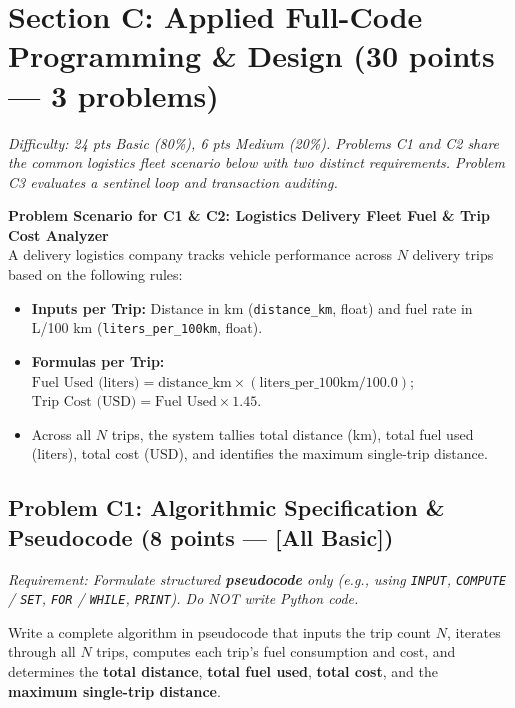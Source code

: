 \documentclass[11pt,a4paper]{article}
\begin{document}
\section*{Section C: Applied Full-Code Programming \& Design \hfill \normalsize\normalfont(30 points --- 3 problems)}
\textit{Difficulty: 24 pts Basic (80\%), 6 pts Medium (20\%). Problems C1 and C2 share the common logistics fleet scenario below with two distinct requirements. Problem C3 evaluates a sentinel loop and transaction auditing.}

\begin{tcolorbox}[colback=boxbg, colframe=secondaryteal, arc=1.2mm, boxrule=0.6pt, left=2.0mm, right=2.0mm, top=0.6mm, bottom=0.6mm]
\textbf{\small Problem Scenario for C1 \& C2: Logistics Delivery Fleet Fuel \& Trip Cost Analyzer}\\[0.2mm]
\footnotesize
A delivery logistics company tracks vehicle performance across $N$ delivery trips based on the following rules:
\begin{itemize}[itemsep=0.1pt,topsep=0.1pt]
  \item \textbf{Inputs per Trip:} Distance in km (\texttt{distance\_km}, float) and fuel rate in L/100 km (\texttt{liters\_per\_100km}, float).
  \item \textbf{Formulas per Trip:}
    $\text{Fuel Used (liters)} = \text{distance\_km} \times (\text{liters\_per\_100km} / 100.0)$; \quad
    $\text{Trip Cost (USD)} = \text{Fuel Used} \times 1.45$.
  \item Across all $N$ trips, the system tallies total distance (km), total fuel used (liters), total cost (USD), and identifies the maximum single-trip distance.
\end{itemize}
\end{tcolorbox}

\vspace{0.3mm}
\subsection*{Problem C1: Algorithmic Specification \& Pseudocode (8 points --- [All Basic])}
\textit{Requirement: Formulate structured \textbf{pseudocode} only (e.g., using \texttt{INPUT}, \texttt{COMPUTE} / \texttt{SET}, \texttt{FOR} / \texttt{WHILE}, \texttt{PRINT}). Do NOT write Python code.}

Write a complete algorithm in pseudocode that inputs the trip count $N$, iterates through all $N$ trips, computes each trip's fuel consumption and cost, and determines the \textbf{total distance}, \textbf{total fuel used}, \textbf{total cost}, and the \textbf{maximum single-trip distance}.
\end{document}
